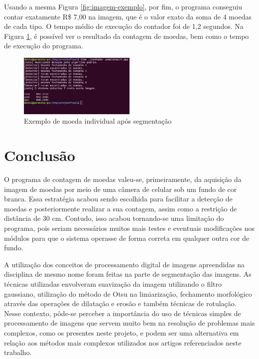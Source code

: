 \documentclass[10pt,journal,compsoc]{IEEEtran}
\begin{document}
Usando a mesma Figura \ref{fig:imagem-exemplo}, por fim, o programa conseguiu contar exatamente R\$ 7,00 na imagem, que é o valor exato da soma de 4 moedas de cada tipo. O tempo médio de execução do contador foi de 1,2 segundos. Na Figura  \ref{fig:resultado-contador}, é possível ver o resultado da contagem de moedas, bem como o tempo de execução do programa.

\begin{figure}[ht]
\centering
\caption{Exemplo de moeda individual após segmentação}
\label{fig:resultado-contador}
\includegraphics[width=0.5\textwidth]{resultado-contador.jpg}
\end{figure}


\section{Conclusão}
\label{sec:conclusao}

O programa de contagem de moedas valeu-se, primeiramente, da aquisição da imagem de moedas por meio de uma câmera de celular sob um fundo de cor branca. Essa estratégia acabou sendo escolhida para facilitar a detecção de moedas e posteriormente realizar a sua contagem, assim como a restrição de distância de 30 cm. Contudo, isso acabou tornando-se uma limitação do programa, pois seriam necessários muitos mais testes e eventuais modificações nos módulos para que o sistema operasse de forma correta em qualquer outra cor de fundo. 

A utilização dos conceitos de processamento digital de imagens apreendidas na disciplina de mesmo nome foram feitas na parte de segmentação das imagens. As técnicas utilizadas envolveram suavização da imagem utilizando o filtro gaussiano, utilização do método de Otsu na limiarização, fechamento morfológico através das operações de dilatação e erosão e também técnicas de rotulação. Nesse contexto, pôde-se perceber a importância do uso de técnicas simples de processamento de imagens que servem muito bem na resolução de problemas mais complexos, como os presentes neste projeto, e podem ser uma alternativa em relação aos métodos mais complexos utilizados nos artigos referenciados neste trabalho.
\end{document}
